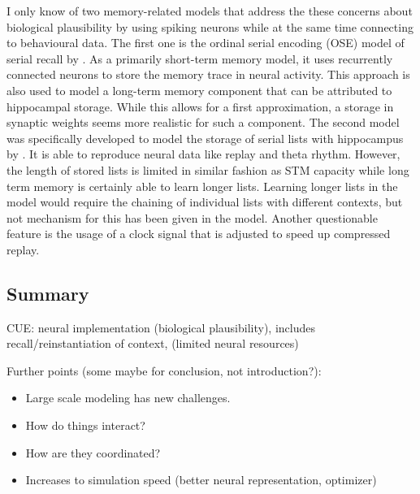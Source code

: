 I only know of two memory-related models that address the these concerns about biological plausibility by using spiking neurons while at the same time connecting to behavioural data.
The first one is the ordinal serial encoding (OSE) model of serial recall by \textcite{Choo2010}.
As a primarily short-term memory model, it uses recurrently connected neurons to store the memory trace in neural activity.
This approach is also used to model a long-term memory component that can be attributed to hippocampal storage.
While this allows for a first approximation, a storage in synaptic weights seems more realistic for such a component.
The second model was specifically developed to model the storage of serial lists with hippocampus by \textcite{OliverTrujillo2014}.
It is able to reproduce neural data like replay and theta rhythm.
However, the length of stored lists is limited in similar fashion as STM capacity while long term memory is certainly able to learn longer lists.
Learning longer lists in the model would require the chaining of individual lists with different contexts, but not mechanism for this has been given in the model.
Another questionable feature is the usage of a clock signal that is adjusted to speed up compressed replay.


\subsection{Summary}

CUE\@: neural implementation (biological plausibility), includes recall/reinstantiation of context, (limited neural resources)


Further points (some maybe for conclusion, not introduction?):
\begin{itemize}
    \item Large scale modeling has new challenges.
    \item How do things interact?
    \item How are they coordinated?
    \item Increases to simulation speed (better neural representation, optimizer)
\end{itemize}
